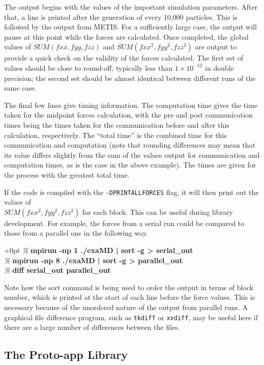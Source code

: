 \documentclass[paper=a4, fontsize=11pt,bibtotoc]{scrartcl}		%
\newenvironment{codebox}{\begin{MakeFramed}{\hsize0.8\linewidth\advance\hsize+0pt\FrameRestore}\normalfont\ttfamily}{\end{MakeFramed}}
\newcommand{\prompt}[1]{\textsl{\%} \textbf{#1}}
\newcommand{\TT}[1]{\texttt{#1}}
\begin{document}
The output begins with the values of the important simulation parameters. After that, a line is printed after the generation of 
every 10,000 particles.  This is followed by the output from METIS.  For a sufficiently large case, the output will pause at this point while the 
forces are calculated. Once completed, the global values of $SUM(fxx, fyy, fzz)$ and $SUM(fxx^2, fyy^2, fzz^2)$ are output to provide a quick check on 
the validity of the forces calculated.  The first set of values should be close to round-off, typically less than $1\times10^{-12}$ in double precision; 
the second set should be almost identical between different runs of the same case.  

The final few lines give timing information. The computation time gives the time taken for the midpoint forces calculation, with the pre and post 
communication times being the times taken for the communication before and after this calculation, respectively. The ``total time'' is the combined 
time for this communication and computation (note that rounding differences may mean that its value differs slightly from the sum of the values output 
for communication and computation times, as is the case in the above example). The times are given for the process with the greatest total time.

If the code is compiled with the \TT{-DPRINTALLFORCES} flag, it will then print out the values of\\ 
$SUM(fxx^2, fyy^2, fzz^2)$ for each block. This can be useful during library development. 
For example, the forces from a serial run could be compared to those from a parallel one 
in the following way.
\begin{codebox}
	\scriptsize
	\noindent
	\prompt{mpirun -np 1 ./exaMD | sort -g > serial\_out}\\
	\prompt{mpirun -np 8 ./exaMD | sort -g > parallel\_out}\\
	\prompt{diff serial\_out parallel\_out}
\end{codebox}
\noindent
Note how the sort command is being used to order the output in terms of block number, 
which is printed at the start of each line before the force values. This is necessary because 
of the unordered nature of the output from parallel runs. A graphical file difference program, 
such as \TT{tkdiff} or \TT{xxdiff}, may be useful here if there are a large number of differences between the files.


\subsection{The Proto-app Library}
\end{document}
